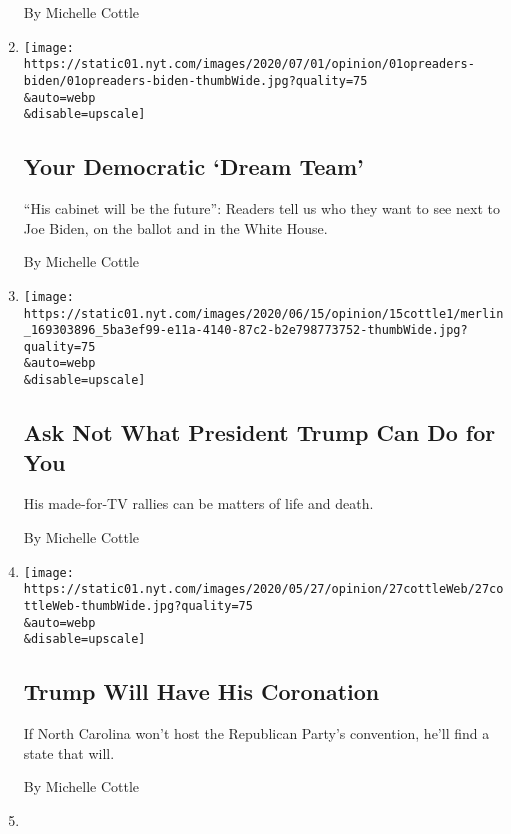 \begin{enumerate}
  By Michelle Cottle
\item
  \href{/2020/07/01/opinion/biden-running-mate-cabinet.html}{}

  \texttt{[image: https://static01.nyt.com/images/2020/07/01/opinion/01opreaders-biden/01opreaders-biden-thumbWide.jpg?quality=75\\\&auto=webp\\\&disable=upscale]}

  \hypertarget{your-democratic-dream-team}{%
  \subsection{Your Democratic `Dream
  Team'}\label{your-democratic-dream-team}}

  ``His cabinet will be the future'': Readers tell us who they want to
  see next to Joe Biden, on the ballot and in the White House.

  By Michelle Cottle
\item
  \href{/2020/06/15/opinion/trump-rally-coronavirus.html}{}

  \texttt{[image: https://static01.nyt.com/images/2020/06/15/opinion/15cottle1/merlin\_169303896\_5ba3ef99-e11a-4140-87c2-b2e798773752-thumbWide.jpg?quality=75\\\&auto=webp\\\&disable=upscale]}

  \hypertarget{ask-not-what-president-trump-can-do-for-you}{%
  \subsection{Ask Not What President Trump Can Do for
  You}\label{ask-not-what-president-trump-can-do-for-you}}

  His made-for-TV rallies can be matters of life and death.

  By Michelle Cottle
\item
  \href{/2020/05/27/opinion/coronavirus-trump-north-carolina.html}{}

  \texttt{[image: https://static01.nyt.com/images/2020/05/27/opinion/27cottleWeb/27cottleWeb-thumbWide.jpg?quality=75\\\&auto=webp\\\&disable=upscale]}

  \hypertarget{trump-will-have-his-coronation}{%
  \subsection{Trump Will Have His
  Coronation}\label{trump-will-have-his-coronation}}

  If North Carolina won't host the Republican Party's convention, he'll
  find a state that will.

  By Michelle Cottle
\item
  \href{/2020/05/20/opinion/biden-vice-president-cabinet.html}{}


\end{enumerate}
